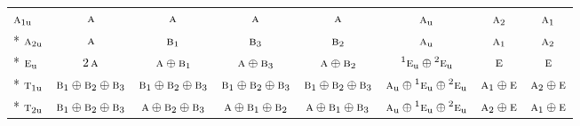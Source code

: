 \documentclass[10pt,a4paper]{article}
\numberwithin{equation}{section}
\newcommand{\irr}[1]{\text{\normalfont\scshape #1}}
\newcommand{\conjpair}[1]{{}^{#1}}
\newcommand{\ptag}[1]{\mathrm{#1}}
\begin{document}
{\begin{longtable}{@{}lccccccc@{}}
$\irr{a}_{1\ptag{u}}$ & $\irr{a}$ & $\irr{a}$ & $\irr{a}$ & $\irr{a}$ & $\irr{a}_{\ptag{u}}$ & $\irr{a}_{2}$ & $\irr{a}_{1}$\\*
$\irr{a}_{2\ptag{u}}$ & $\irr{a}$ & $\irr{b}_{1}$ & $\irr{b}_{3}$ & $\irr{b}_{2}$ & $\irr{a}_{\ptag{u}}$ & $\irr{a}_{1}$ & $\irr{a}_{2}$\\*
$\irr{e}_{\ptag{u}}$ & $2\,\irr{a}$ & $\irr{a}\oplus \irr{b}_{1}$ & $\irr{a}\oplus \irr{b}_{3}$ & $\irr{a}\oplus \irr{b}_{2}$ & $\conjpair{1}\irr{e}_{\ptag{u}}\oplus \conjpair{2}\irr{e}_{\ptag{u}}$ & $\irr{e}$ & $\irr{e}$\\*
$\irr{t}_{1\ptag{u}}$ & $\irr{b}_{1}\oplus \irr{b}_{2}\oplus \irr{b}_{3}$ & $\irr{b}_{1}\oplus \irr{b}_{2}\oplus \irr{b}_{3}$ & $\irr{b}_{1}\oplus \irr{b}_{2}\oplus \irr{b}_{3}$ & $\irr{b}_{1}\oplus \irr{b}_{2}\oplus \irr{b}_{3}$ & $\irr{a}_{\ptag{u}}\oplus \conjpair{1}\irr{e}_{\ptag{u}}\oplus \conjpair{2}\irr{e}_{\ptag{u}}$ & $\irr{a}_{1}\oplus \irr{e}$ & $\irr{a}_{2}\oplus \irr{e}$\\*
$\irr{t}_{2\ptag{u}}$ & $\irr{b}_{1}\oplus \irr{b}_{2}\oplus \irr{b}_{3}$ & $\irr{a}\oplus \irr{b}_{2}\oplus \irr{b}_{3}$ & $\irr{a}\oplus \irr{b}_{1}\oplus \irr{b}_{2}$ & $\irr{a}\oplus \irr{b}_{1}\oplus \irr{b}_{3}$ & $\irr{a}_{\ptag{u}}\oplus \conjpair{1}\irr{e}_{\ptag{u}}\oplus \conjpair{2}\irr{e}_{\ptag{u}}$ & $\irr{a}_{2}\oplus \irr{e}$ & $\irr{a}_{1}\oplus \irr{e}$\\
\bottomrule\end{longtable}}
\end{document}
